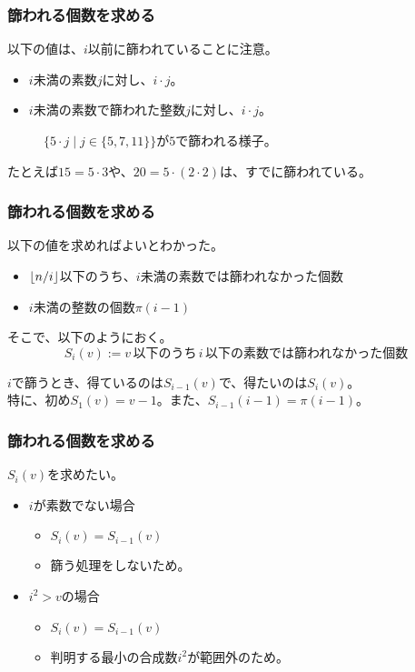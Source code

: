 \documentclass[
  lualatex,
  ja=standard,
  compress,
  hyperref={colorlinks, urlcolor=magenta, linkcolor=blue!55!black},
  dvipsnames,
  svgnames,
]{beamer}
\begin{document}
\begin{frame}
  \frametitle{篩われる個数を求める \theslidetopic}

  以下の値は、$i$以前に篩われていることに注意。
  \begin{itemize}
  \item $i$未満の素数$j$に対し、$i\cdot j$。
  \item $i$未満の素数で篩われた整数$j$に対し、$i\cdot j$。
  \end{itemize}
  \begin{figure}
    \caption{$\{5\cdot j\mid j\in\{5, 7, 11\}\}$が$5$で篩われる様子。}
  \end{figure}
  \vspace{-1em}
  たとえば$15=5\cdot 3$や、$20 = 5\cdot(2\cdot 2)$は、すでに篩われている。
\end{frame}

\begin{frame}
  \frametitle{篩われる個数を求める \theslidetopic}

  以下の値を求めればよいとわかった。
  \begin{itemize}
  \item $\lfloor n/i\rfloor$以下のうち、$i$未満の素数では篩われなかった個数
  \item $i$未満の整数の個数$\pi(i-1)$
  \end{itemize}

  そこで、以下のようにおく。
  $$S_i(v):=v\,\text{以下のうち}\,i\,\text{以下の素数では篩われなかった個数}$$

  $i$で篩うとき、得ているのは$S_{i-1}(v)$で、得たいのは$S_i(v)$。\\
  特に、初め$S_1(v) = v - 1$。また、$S_{i-1}(i-1) = \pi(i-1)$。
\end{frame}

\begin{frame}
  \frametitle{篩われる個数を求める \theslidetopic}

  $S_i(v)$を求めたい。

  \begin{itemize}
  \item $i$が素数でない場合
    \begin{itemize}
    \item $S_i(v) = S_{i-1}(v)$
    \item 篩う処理をしないため。
    \end{itemize}
  \item $i^2>v$の場合
    \begin{itemize}
    \item $S_i(v) = S_{i-1}(v)$
    \item 判明する最小の合成数$i^2$が範囲外のため。
    \end{itemize}
  \end{itemize}
\end{frame}
\end{document}
